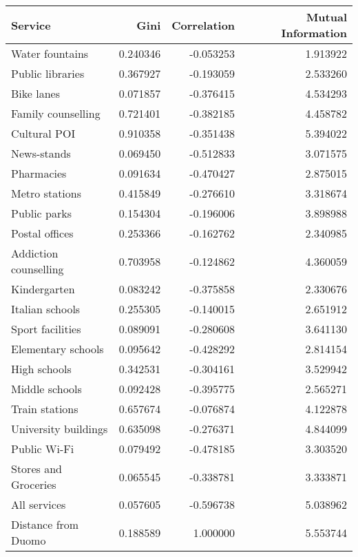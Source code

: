 \documentclass[11pt, titlepage]{article}
\begin{document}
\begin{table}
\centering
\begin{tabular}{lrrr}
	\toprule
				  Service &     Gini &  Correlation &  Mutual Information \\
	\midrule
		  Water fountains & 0.240346 &    -0.053253 &            1.913922 \\
		 Public libraries & 0.367927 &    -0.193059 &            2.533260 \\
			   Bike lanes & 0.071857 &    -0.376415 &            4.534293 \\
	   Family counselling & 0.721401 &    -0.382185 &            4.458782 \\
			 Cultural POI & 0.910358 &    -0.351438 &            5.394022 \\
			  News-stands & 0.069450 &    -0.512833 &            3.071575 \\
			   Pharmacies & 0.091634 &    -0.470427 &            2.875015 \\
		   Metro stations & 0.415849 &    -0.276610 &            3.318674 \\
			 Public parks & 0.154304 &    -0.196006 &            3.898988 \\
		   Postal offices & 0.253366 &    -0.162762 &            2.340985 \\
	Addiction counselling & 0.703958 &    -0.124862 &            4.360059 \\
			 Kindergarten & 0.083242 &    -0.375858 &            2.330676 \\
		  Italian schools & 0.255305 &    -0.140015 &            2.651912 \\
		 Sport facilities & 0.089091 &    -0.280608 &            3.641130 \\
	   Elementary schools & 0.095642 &    -0.428292 &            2.814154 \\
			 High schools & 0.342531 &    -0.304161 &            3.529942 \\
		   Middle schools & 0.092428 &    -0.395775 &            2.565271 \\
		   Train stations & 0.657674 &    -0.076874 &            4.122878 \\
	 University buildings & 0.635098 &    -0.276371 &            4.844099 \\
					Public Wi-Fi & 0.079492 &    -0.478185 &            3.303520 \\
	 Stores and Groceries & 0.065545 &    -0.338781 &            3.333871 \\
			 All services & 0.057605 &    -0.596738 &            5.038962 \\
			   Distance from Duomo & 0.188589 &     1.000000 &            5.553744 \\
	\bottomrule
	\end{tabular}
	

\end{table}
\end{document}
